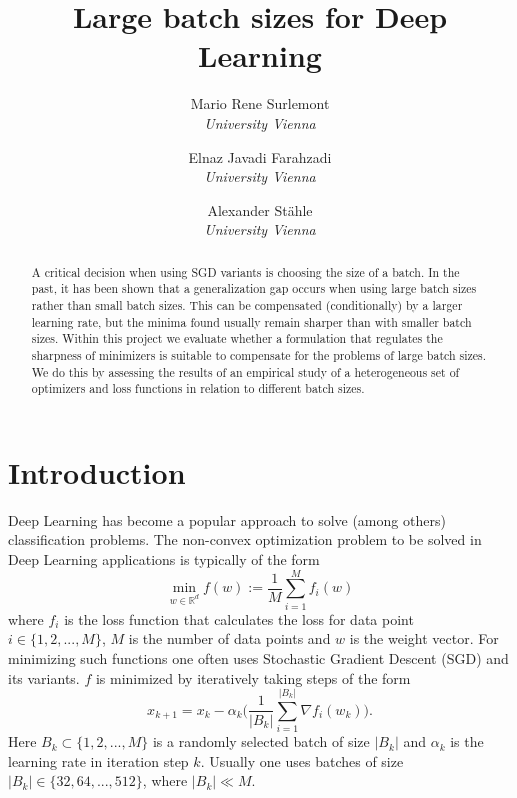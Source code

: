 \documentclass[10pt,conference,compsocconf]{IEEEtran}
\begin{document}
\title{Large batch sizes for Deep Learning}
\author{
  Mario Rene Surlemont\\
  \textit{University Vienna}\and Elnaz Javadi Farahzadi\\
  \textit{University Vienna}\and Alexander Stähle\\
  \textit{University Vienna}
}

\maketitle

\begin{abstract}
A critical decision when using SGD variants is choosing the size of a batch. In the past, it has been shown that a generalization gap occurs when using large batch sizes rather than small batch sizes. This can be compensated (conditionally) by a larger learning rate, but the minima found usually remain sharper than with smaller batch sizes. Within this project we evaluate whether a formulation that regulates the sharpness of minimizers is suitable to compensate for the problems of large batch sizes. We do this by assessing the results of an empirical study of a heterogeneous set of optimizers and loss functions in relation to different batch sizes. 
\end{abstract}

\section{Introduction}
\label{sec:introduction}
Deep Learning has become a popular approach to solve (among others) classification problems. 
The non-convex optimization problem to be solved in Deep Learning applications is typically of the form 
\begin{equation} \label{eq:loss}
\min_{w \in \mathbb{R}^d}{f(w) := \frac{1}{M} \sum_{i = 1}^M{f_i(w)}}
\end{equation}
where $f_i$ is the loss function that calculates the loss for data point $i \in \{1, 2, ..., M\}$, $M$ is the number of data points and $w$ is the weight vector. 
For minimizing such functions one often uses Stochastic Gradient Descent (SGD) and its variants. $f$ is minimized by iteratively taking steps of the form
\begin{equation}
x_{k+1} = x_k - \alpha_k \biggl(\frac{1}{|B_k|} \sum_{i = 1}^{|B_k|}{\nabla f_i(w_k) \biggl)}.
\end{equation}
Here $B_k \subset \{1,2,..., M\}$ is a randomly selected batch of size $|B_k|$ and $\alpha_k$ is the learning rate in iteration step $k$. Usually one uses batches of size $|B_k| \in \{32, 64, ..., 512\}$, where $|B_k| \ll M$. 
\end{document}
